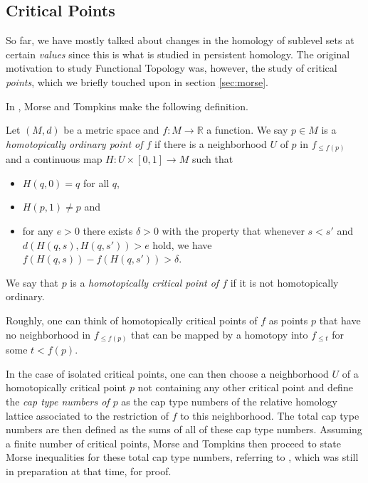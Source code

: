 \subsection{Critical Points}
So far, we have mostly talked about changes in the homology of sublevel sets at certain \emph{values} since this is what is studied in persistent homology. The original motivation to study Functional Topology was, however, the study of critical \emph{points}, which we briefly touched upon in section \ref{sec:morse}.

In \cite{Morse.1939}, Morse and Tompkins make the following definition.

\begin{defi}
Let $(M,d)$ be a metric space and $f\colon M\to\mathbb{R}$ a function. We say $p\in M$ is a \emph{homotopically ordinary point of $f$} if there is a neighborhood $U$ of $p$ in $f_{\leq f(p)}$ and a continuous map $H\colon U\times[0,1]\to M$ such that
\begin{itemize}
\item $H(q,0)=q$ for all $q$,
\item $H(p,1)\neq p$ and
\item for any $e>0$ there exists $\delta>0$ with the property that whenever $s<s'$ and $d(H(q,s),H(q,s'))>e$ hold, we have $f(H(q,s))-f(H(q,s'))>\delta$.
\end{itemize}
We say that $p$ is a \emph{homotopically critical point of $f$} if it is not homotopically ordinary.
\end{defi}

Roughly, one can think of homotopically critical points of $f$ as points $p$ that have no neighborhood in $f_{\leq f(p)}$ that can be mapped by a homotopy into $f_{\leq t}$ for some $t<f(p)$.

In the case of isolated critical points, one can then choose a neighborhood $U$ of a homotopically critical point $p$ not containing any other critical point and define the \emph{cap type numbers of $p$} as the cap type numbers of the relative homology lattice associated to the restriction of $f$ to this neighborhood. The total cap type numbers are then defined as the sums of all of these cap type numbers. Assuming a finite number of critical points, Morse and Tompkins then proceed to state Morse inequalities for these total cap type numbers, referring to \cite{Morse.1940}, which was still in preparation at that time, for proof. 

